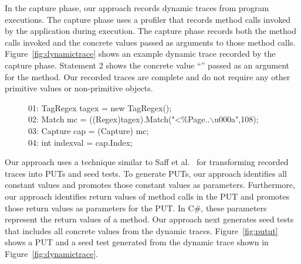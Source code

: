 In the capture phase, our approach records dynamic traces from program executions. The capture phase uses a profiler that records method calls invoked by the application during execution. The capture phase records both the method calls invoked and the concrete values passed as arguments to those method calls. Figure~\ref{fig:dynamictrace} shows an example dynamic trace recorded by the capture phase. Statement 2 shows the concrete value ``'' passed as an argument for the  method. Our recorded traces are complete and do not require any other primitive values or non-primitive objects. 

\begin{figure}[t]
\begin{CodeOut}
01: TagRegex tagex = new TagRegex();\\
02: Match mc = ((Regex)tagex).Match("<\%\@ Page..$\backslash$u000a",108);\\
03: Capture cap = (Capture) mc;\\
04: int indexval = cap.Index;\\
\end{CodeOut}\vspace*{-3ex}
\vspace*{-1ex}
\end{figure}

Our approach uses a technique similar to Saff et al.~\cite{david:java} for transforming recorded traces into PUTs and seed tests. To generate PUTs, our approach identifies all constant values and promotes those constant values as parameters. Furthermore, our approach identifies return values of method calls in the PUT and promotes those return values as  parameters for the PUT. In C\#, these  parameters represent the return values of a method. Our approach next generates seed tests that includes all concrete values from the dynamic traces. Figure~\ref{fig:putut} shows a PUT and a seed test generated from the dynamic trace shown in Figure~\ref{fig:dynamictrace}.

